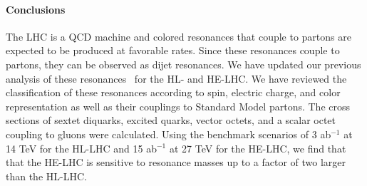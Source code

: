 \paragraph*{Conclusions}
\label{par:conc}

The LHC is a QCD machine and colored resonances that couple to partons are expected to be produced at favorable rates.  Since these resonances couple to partons, they can be observed as dijet resonances. We have updated our previous analysis of these resonances~\cite{Han:2010rf} for the HL- and HE-LHC.  We have reviewed the classification of these resonances according to spin, electric charge, and color representation as well as their couplings to Standard Model partons.  The cross sections of sextet diquarks, excited quarks, vector octets, and a scalar octet coupling to gluons were calculated.  Using the benchmark scenarios of 3 ab$^{-1}$ at 14 TeV for the HL-LHC and 15 ab$^{-1}$ at 27 TeV for the HE-LHC, we find that that the HE-LHC is sensitive to resonance masses up to a factor of two larger than the HL-LHC.

%
%
%
